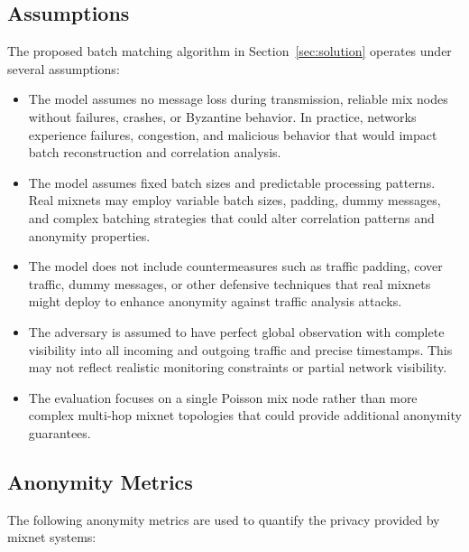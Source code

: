 \documentclass{article}
\begin{document}
\subsection{Assumptions}
\label{sec:assumptions}

The proposed batch matching algorithm in Section~\ref{sec:solution}
operates under several assumptions:

\begin{itemize}
\item The model assumes no message loss during transmission, 
reliable mix nodes without failures, crashes, or Byzantine 
behavior. In practice, networks experience failures, 
congestion, and malicious behavior that would 
impact batch reconstruction and correlation analysis.

\item The model assumes fixed batch sizes and predictable 
processing patterns. Real mixnets may employ variable batch sizes, 
padding, dummy messages, and complex 
batching strategies that could alter correlation 
patterns and anonymity properties.

\item The model does not include countermeasures such as 
traffic padding, cover traffic, dummy messages, or other 
defensive techniques that real mixnets might deploy to 
enhance anonymity against traffic analysis attacks.

\item The adversary is assumed to have perfect global observation 
with complete visibility into all incoming and outgoing traffic 
and precise timestamps. This may not reflect realistic monitoring 
constraints or partial network visibility.

\item The evaluation focuses on a single Poisson mix node 
rather than more complex multi-hop mixnet topologies that 
could provide additional anonymity guarantees.
\end{itemize}

\subsection{Anonymity Metrics}
\label{sec:anonymity_metrics}

The following anonymity metrics are used to quantify the 
privacy provided by mixnet systems:
\end{document}
